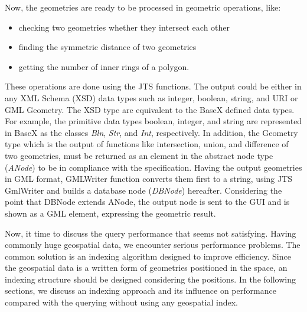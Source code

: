 \documentclass[a4paper,12pt]{article}
\begin{document}
Now, the geometries are ready to be processed in geometric operations, like:
\begin{itemize}
\item checking two geometries whether they intersect each other
\item finding the symmetric distance of two geometries
\item getting the number of inner rings of a polygon.
\end{itemize}
These operations are done using the JTS functions. The output could be either in any XML Schema (XSD) data types such as integer, boolean, string, and URI or GML Geometry. The XSD type are equivalent to the BaseX defined data types. For example, the primitive data types boolean, integer, and string are represented in BaseX as the classes \textit{Bln}, \textit{Str}, and \textit{Int}, respectively. In addition, the Geometry type which is the output of functions like intersection, union, and difference of two geometries, must be returned as an element in the abstract node type (\textit{ANode}) to be in compliance with the specification. Having the output geometries in GML format, GMLWriter function converts them first to a string, using JTS GmlWriter and builds a database node (\textit{DBNode}) hereafter. Considering the point that DBNode extends ANode, the output node is sent to the GUI and is shown as a GML element, expressing the geometric result. 

Now, it time to discuss the query performance that seems not satisfying. Having commonly huge geospatial data, we encounter serious performance problems. The common solution is an indexing algorithm designed to improve efficiency. Since the geospatial data is a written form of geometries positioned in the space, an indexing structure should be designed considering the positions. In the following sections, we discuss an indexing approach and its influence on performance compared with the querying without using any geospatial index.
\end{document}

